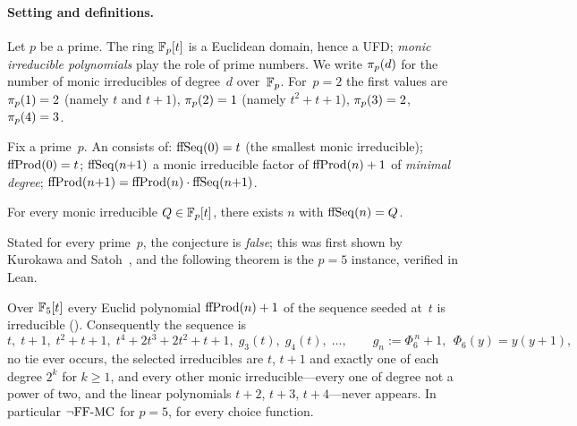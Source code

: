\paragraph{Setting and definitions.}

Let $p$ be a prime.  The ring $\mathbb{F}_p[t]$ is a Euclidean domain, hence a UFD;
\emph{monic irreducible polynomials} play the role of prime numbers.  We
write $\pi_p(d)$ for the number of monic irreducibles of degree~$d$
over~$\mathbb{F}_p$.  For~$p=2$ the first values are
$\pi_p(1) = 2$ (namely $t$ and $t{+}1$),
$\pi_p(2) = 1$ (namely $t^2{+}t{+}1$), $\pi_p(3) = 2$,
$\pi_p(4) = 3$.

\begin{definition}
\label{def:ffem}
Fix a prime~$p$.  An  consists of:
$\mathrm{ffSeq}(0) = t$ (the smallest monic irreducible);
$\mathrm{ffProd}(0) = t$;
$\mathrm{ffSeq}(n{+}1)$ a monic irreducible factor of $\mathrm{ffProd}(n)+1$ of
\emph{minimal degree};
$\mathrm{ffProd}(n{+}1) = \mathrm{ffProd}(n)\cdot\mathrm{ffSeq}(n{+}1)$.
\end{definition}

\begin{conjecture}
\label{conj:ffmc}
For every monic irreducible $Q \in \mathbb{F}_p[t]$, there exists $n$ with
$\mathrm{ffSeq}(n) = Q$.
\end{conjecture}

Stated for every prime~$p$, the conjecture is \emph{false}; this was
first shown by Kurokawa and Satoh~\cite{KuSa2008}, and the following
theorem is the $p = 5$ instance, verified in Lean.

\begin{theorem}
\label{thm:ffmc-false-five}
Over $\mathbb{F}_5[t]$ every Euclid polynomial $\mathrm{ffProd}(n)+1$ of the sequence
seeded at~$t$ is irreducible
().
Consequently the sequence is
\[
  t,\; t+1,\; t^2+t+1,\; t^4+2t^3+2t^2+t+1,\; g_3(t),\; g_4(t),\;\dots,
  \qquad g_n := \Phi_6^{\,n} + 1,\ \ \Phi_6(y) = y(y+1),
\]
no tie ever occurs, the selected irreducibles are $t$, $t+1$ and exactly
one of each degree $2^k$ for $k \geq 1$, and every other monic
irreducible---every one of degree not a power of two, and the linear
polynomials $t+2$, $t+3$, $t+4$---never appears.  In particular $\neg\mathrm{FF\text{-}MC}$ for
$p = 5$, for every choice function.
\end{theorem}

